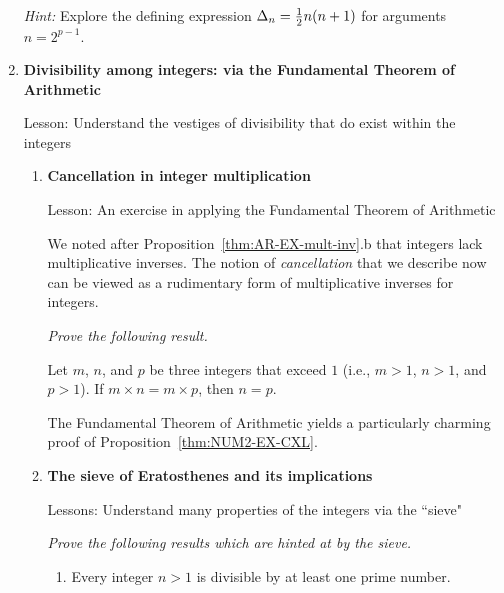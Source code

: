 \begin{enumerate}
\medskip

{\em Hint:} Explore the defining expression $\Delta_{n} = {1 \over 2} n(n+1)$ for arguments $n = 2^{p-1}$. 


\medskip\item
{\bf Divisibility among integers: via the Fundamental Theorem of Arithmetic}

{\sc Lesson:} Understand the vestiges of divisibility that do exist within the integers

  \begin{enumerate}
  \item
{\bf Cancellation in integer multiplication}

{\sc Lesson:} An exercise in applying the Fundamental Theorem of Arithmetic

\smallskip


We noted after Proposition~\ref{thm:AR-EX-mult-inv}.b that integers lack multiplicative inverses.  The notion of {\it cancellation} that we describe now can be viewed as a rudimentary form of multiplicative inverses for integers.

\smallskip

{\em Prove the following result.}

\begin{prop}
\label{thm:NUM2-EX-CXL}
Let $m$, $n$, and $p$ be three integers that exceed $1$ (i.e., $m>1$, $n>1$, and $p >1$).  If $m \times n = m \times p$, then $n = p$.
\end{prop}

The Fundamental Theorem of Arithmetic yields a particularly charming proof of Proposition~\ref{thm:NUM2-EX-CXL}.
\medskip

  \medskip\item
{\bf The sieve of Eratosthenes and its implications}

{\sc Lessons:} Understand many properties of the integers via the ``sieve"


\smallskip

{\em Prove the following results which are hinted at by the sieve.}
\smallskip
     \begin{enumerate}
     \item
\begin{prop}
Every integer $n>1$ is divisible by at least one prime number.
\end{prop}


\end{enumerate}
\end{enumerate}
\end{enumerate}
